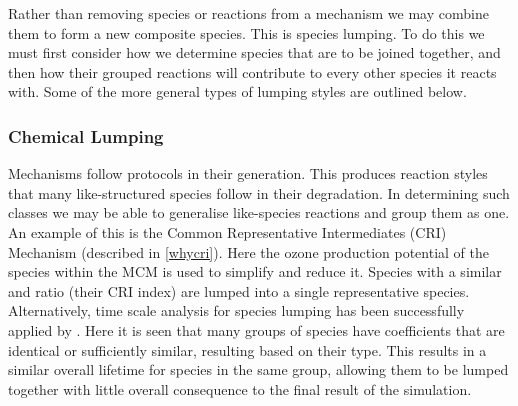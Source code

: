 Rather than removing species or reactions from a mechanism we may combine them to form a new composite species. This is species lumping. To do this we must first consider how we determine species that are to be joined together, and then how their grouped reactions will contribute to every other species it reacts with. Some of the more general types of lumping styles are outlined below. 


\subsubsection{Chemical Lumping}\label{sec:chemlump}
Mechanisms follow protocols in their generation. This produces reaction styles that many like-structured species follow in their degradation. In determining such classes we may be able to generalise like-species reactions and group them as one.
An example of this is the Common Representative Intermediates (CRI) Mechanism (described in \autoref{whycri}).  Here the ozone production potential of the species within the MCM is used to simplify and reduce it. Species with a similar  and  ratio (their CRI index) are lumped into a single representative species. Alternatively, time scale analysis for species lumping has been successfully applied by  \cite{lifetime}. Here it is seen that many groups of species have coefficients that are identical or sufficiently similar, resulting based on their type. This results in a similar overall lifetime for species in the same group, allowing them to be lumped together with little overall consequence to the final result of the simulation. 

